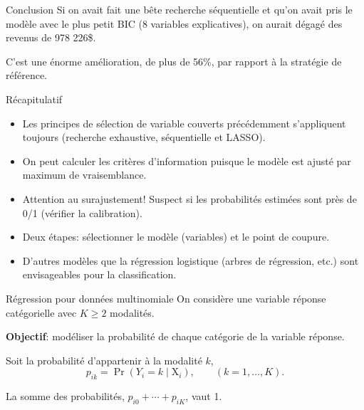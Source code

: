 \documentclass[
  ignorenonframetext,
]{beamer}
\providecommand{\tightlist}{%
  \setlength{\itemsep}{0pt}\setlength{\parskip}{0pt}}\usepackage{longtable,booktabs,array}
\begin{document}
\begin{frame}{Conclusion}
\protect\hypertarget{conclusion}{}
Si on avait fait une bête recherche séquentielle et qu'on avait pris le
modèle avec le plus petit BIC (8 variables explicatives), on aurait
dégagé des revenus de 978 226\$.

C'est une énorme amélioration, de plus de 56\%, par rapport à la
stratégie de référence.
\end{frame}

\begin{frame}{Récapitulatif}
\protect\hypertarget{ruxe9capitulatif}{}
\begin{itemize}
\tightlist
\item
  Les principes de sélection de variable couverts précédemment
  s'appliquent toujours (recherche exhaustive, séquentielle et LASSO).
\item
  On peut calculer les critères d'information puisque le modèle est
  ajusté par maximum de vraisemblance.
\item
  Attention au surajustement! Suspect si les probabilités estimées sont
  près de 0/1 (vérifier la calibration).
\item
  Deux étapes: sélectionner le modèle (variables) et le point de
  coupure.
\item
  D'autres modèles que la régression logistique (arbres de régression,
  etc.) sont envisageables pour la classification.
\end{itemize}
\end{frame}

\begin{frame}{Régression pour données multinomiale}
\protect\hypertarget{ruxe9gression-pour-donnuxe9es-multinomiale}{}
On considère une variable réponse catégorielle avec \(K \ge 2\)
modalités.

\textbf{Objectif}: modéliser la probabilité de chaque catégorie de la
variable réponse.

Soit la probabilité d'appartenir à la modalité \(k\),
\[p_{ik} = \Pr(Y_i=k \mid \mathrm{X}_i), \qquad (k=1, \ldots, K).\]

La somme des probabilités, \(p_{i0} + \cdots + p_{iK}\), vaut 1.
\end{frame}
\end{document}
